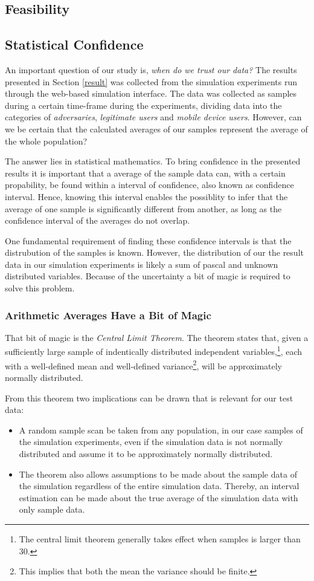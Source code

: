 \subsection{Feasibility}
\subsection{Statistical Confidence}
An important question of our study is, \emph{when do we trust our data?} The results presented in Section \ref{result} was collected from the simulation experiments run through the web-based simulation interface. The data was collected as samples during a certain time-frame during the experiments, dividing data into the categories of \emph{adversaries}, \emph{legitimate users} and \emph{mobile device users}. However,  can we be certain that the calculated averages of our samples represent the average of the whole population?

The answer lies in statistical mathematics. To bring confidence in the presented results it is important that a average of the sample data can, with a certain propability, be found within a interval of confidence, also known as confidence interval. Hence, knowing this interval enables the possiblity to infer that the average of one sample is significantly different from another, as long as the confidence interval of the averages do not overlap.

One fundamental requirement of finding these confidence intervals is that the distrubution of the samples is known. However, the distribution of our the result data in our simulation experiments is likely a sum of pascal and unknown distributed variables. Because of the uncertainty a bit of magic is required to solve this problem. 

\subsubsection{Arithmetic Averages Have a Bit of Magic}
That bit of magic is the \emph{Central Limit Theorem}. The theorem states that, given a sufficiently large sample of indentically distributed independent variables,\footnote{The central limit theorem generally takes effect when samples is larger than 30.}, each with a well-defined mean and well-defined variance\footnote{This implies that both the mean the variance should be finite.}, will be approximately normally distributed\cite{gunnar}.

From this theorem two implications can be drawn that is relevant for our test data:
\begin{itemize}
\item A random sample scan be taken from any population, in our case samples of the simulation experiments, even if the simulation data is not normally distributed and assume it to be approximately normally distributed.

\item The theorem also allows assumptions to be made about the sample data of the simulation regardless of the entire simulation data. Thereby, an interval estimation can be made about the true average of the simulation data with only sample data.
\end{itemize}


